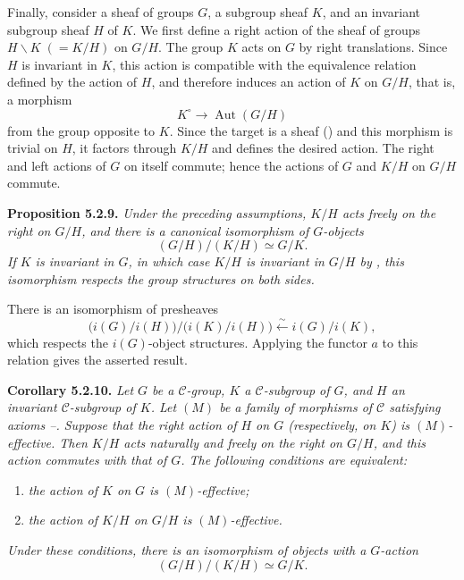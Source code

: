 Finally, consider a sheaf of groups \(G\), a subgroup sheaf \(K\), and an
invariant subgroup sheaf \(H\) of \(K\). We first define a right action of
the sheaf of groups \(H\backslash K\;(=K/H)\) on \(G/H\). The group
\(K\) acts on \(G\) by right translations. Since \(H\) is invariant in
\(K\), this action is compatible with the equivalence relation defined by
the action of \(H\), and therefore induces an action of \(K\) on \(G/H\),
that is, a morphism
\[
  K^{\circ}\longrightarrow\operatorname{Aut}(G/H)
\]
from the group opposite to \(K\). Since the target is a sheaf () and
this morphism is trivial on \(H\), it factors through \(K/H\) and defines
the desired action. The right and left actions of \(G\) on itself commute;
hence the actions of \(G\) and \(K/H\) on \(G/H\) commute.

\medskip
\noindent{}\textbf{Proposition 5.2.9.}
\textit{Under the preceding assumptions, \(K/H\) acts freely on the right
on \(G/H\), and there is a canonical isomorphism of \(G\)-objects}
\[
  (G/H)/(K/H)\simeq G/K.
\]
\textit{If \(K\) is invariant in \(G\), in which case \(K/H\) is invariant
in \(G/H\) by , this isomorphism respects the group structures on
both sides.}

There is an isomorphism of presheaves
\[
  \bigl(i(G)/i(H)\bigr)\big/\bigl(i(K)/i(H)\bigr)
  \xleftarrow{\sim} i(G)/i(K),
\]
which respects the \(i(G)\)-object structures. Applying the functor \(a\)
to this relation gives the asserted result.

\medskip
\noindent{}\textbf{Corollary 5.2.10.}
\textit{Let \(G\) be a \(\mathscr C\)-group, \(K\) a
\(\mathscr C\)-subgroup of \(G\), and \(H\) an invariant
\(\mathscr C\)-subgroup of \(K\). Let \((M)\) be a family of morphisms of
\(\mathscr C\) satisfying axioms --. Suppose that
the right action of \(H\) on \(G\) (respectively, on \(K\)) is
\((M)\)-effective. Then \(K/H\) acts naturally and freely on the right on
\(G/H\), and this action commutes with that of \(G\). The following
conditions are equivalent:}
\begin{enumerate}
  \item[(i)] \textit{the action of \(K\) on \(G\) is
  \((M)\)-effective;}
  \item[(ii)] \textit{the action of \(K/H\) on \(G/H\) is
  \((M)\)-effective.}
\end{enumerate}
\textit{Under these conditions, there is an isomorphism of
objects with a \(G\)-action}
\[
  (G/H)/(K/H)\simeq G/K.
\]

